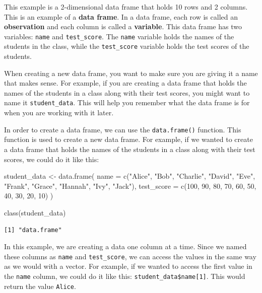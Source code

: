 \documentclass[
  letterpaper,
  DIV=11,
  numbers=noendperiod]{scrreprt}
\newenvironment{Shaded}{\begin{snugshade}}{\end{snugshade}}
\newcommand{\AttributeTok}[1]{\textcolor[rgb]{0.40,0.45,0.13}{#1}}
\newcommand{\DecValTok}[1]{\textcolor[rgb]{0.68,0.00,0.00}{#1}}
\newcommand{\FunctionTok}[1]{\textcolor[rgb]{0.28,0.35,0.67}{#1}}
\newcommand{\NormalTok}[1]{\textcolor[rgb]{0.00,0.23,0.31}{#1}}
\newcommand{\OtherTok}[1]{\textcolor[rgb]{0.00,0.23,0.31}{#1}}
\newcommand{\StringTok}[1]{\textcolor[rgb]{0.13,0.47,0.30}{#1}}
\begin{document}
This example is a 2-dimensional data frame that holds 10 rows and 2
columns. This is an example of a \textbf{data frame}. In a data frame,
each row is called an \textbf{observation} and each column is called a
\textbf{variable}. This data frame has two variables: \texttt{name} and
\texttt{test\_score}. The \texttt{name} variable holds the names of the
students in the class, while the \texttt{test\_score} variable holds the
test scores of the students.

When creating a new data frame, you want to make sure you are giving it
a name that makes sense. For example, if you are creating a data frame
that holds the names of the students in a class along with their test
scores, you might want to name it \texttt{student\_data}. This will help
you remember what the data frame is for when you are working with it
later.

In order to create a data frame, we can use the \texttt{data.frame()}
function. This function is used to create a new data frame. For example,
if we wanted to create a data frame that holds the names of the students
in a class along with their test scores, we could do it like this:

\begin{Shaded}
\begin{Highlighting}[]
\NormalTok{student\_data }\OtherTok{\textless{}{-}} \FunctionTok{data.frame}\NormalTok{(}
  \AttributeTok{name =} \FunctionTok{c}\NormalTok{(}\StringTok{"Alice"}\NormalTok{, }\StringTok{"Bob"}\NormalTok{, }\StringTok{"Charlie"}\NormalTok{, }\StringTok{"David"}\NormalTok{, }\StringTok{"Eve"}\NormalTok{, }\StringTok{"Frank"}\NormalTok{, }\StringTok{"Grace"}\NormalTok{, }\StringTok{"Hannah"}\NormalTok{, }\StringTok{"Ivy"}\NormalTok{, }\StringTok{"Jack"}\NormalTok{),}
  \AttributeTok{test\_score =} \FunctionTok{c}\NormalTok{(}\DecValTok{100}\NormalTok{, }\DecValTok{90}\NormalTok{, }\DecValTok{80}\NormalTok{, }\DecValTok{70}\NormalTok{, }\DecValTok{60}\NormalTok{, }\DecValTok{50}\NormalTok{, }\DecValTok{40}\NormalTok{, }\DecValTok{30}\NormalTok{, }\DecValTok{20}\NormalTok{, }\DecValTok{10}\NormalTok{)}
\NormalTok{)}

\FunctionTok{class}\NormalTok{(student\_data)}
\end{Highlighting}
\end{Shaded}

\begin{verbatim}
[1] "data.frame"
\end{verbatim}

In this example, we are creating a data one column at a time. Since we
named these columns as \texttt{name} and \texttt{test\_score}, we can
access the values in the same way as we would with a vector. For
example, if we wanted to access the first value in the \texttt{name}
column, we could do it like this: \texttt{student\_data\$name{[}1{]}}.
This would return the value \texttt{Alice}.
\end{document}
